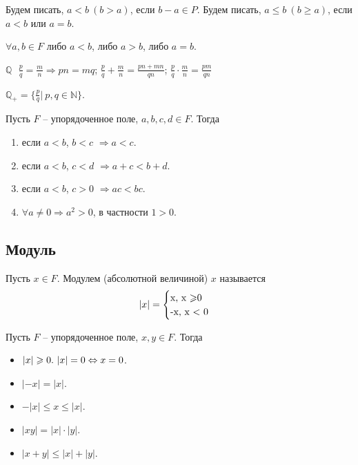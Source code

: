     Будем писать, $a < b \ (b > a)$, если $b - a \in P$. Будем писать, $a \leq b \ (b \geq a)$, если $a < b$ или $a = b$.
    
    \begin{note}
        $\forall a,b \in F$ либо $a < b$, либо $a > b$, либо $a = b$.
    \end{note}
    
    \begin{example}
        $\mathds{Q} \ \ \  \frac{p}{q} = \frac{m}{n} \Rightarrow pn = mq$; $\frac{p}{q} + \frac{m}{n} = \frac{pn + mn}{qn}$; $\frac{p}{q} \cdot \frac{m}{n} = \frac{pm}{qn}$
    \end{example}
    
    $\mathds{Q}_{+} = \{\frac{p}{q}| \ p, q \in \mathds{N}\}$.
    
    \begin{lemma}
        Пусть $F$ -- упорядоченное поле, $a, b, c, d \in F$. Тогда
        \begin{enumerate}
            \item если $a < b$, $b < c$ $\Rightarrow a < c$.
            \item если $a < b$, $c < d$ $\Rightarrow a + c < b + d$.
            \item если $a < b$, $c > 0$ $\Rightarrow ac < bc$.
            \item $\forall a \neq 0 \Rightarrow a^{2} > 0$, в частности $1 > 0$.
        \end{enumerate}
    \end{lemma}
    
\subsection{Модуль}
    
    \begin{definition}
        Пусть $x \in F$. Модулем (абсолютной величиной) $x$ называется 
        \[|x| = 
        \begin{cases}
            $x, x \geq 0$
            \\
            $-x, x < 0$
        \end{cases}\]
    \end{definition}
    
    \begin{lemma}
        Пусть $F$ -- упорядоченное поле, $x, y \in F$. Тогда 
        \begin{itemize}
            \item $|x| \geqslant 0. \  |x| = 0 \Leftrightarrow x = 0$.
            \item $|-x| = |x|$.
            \item $-|x| \leq x \leq |x|$.
            \item $|xy| = |x| \cdot |y|$.
            \item $|x + y| \leq |x| + |y|$.
        \end{itemize}
    \end{lemma}
    
